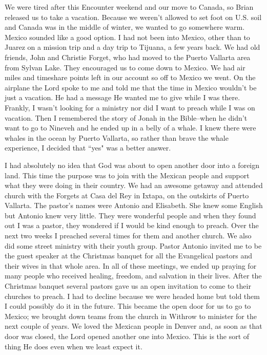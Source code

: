 \documentclass[oneside,12pt]{book}
\begin{document}
We were tired after this Encounter weekend and our move to Canada, so Brian released us to take a vacation. Because we weren't allowed to set foot on U.S. soil and Canada was in the middle of winter, we wanted to go somewhere warm.  Mexico sounded like a good option. I had not been into Mexico, other than to Juarez on a mission trip and a day trip to Tijuana, a few years back. We had old friends, John and Christie Forget, who had moved to the Puerto Vallarta area from Sylvan Lake. They encouraged us to come down to Mexico. We had air miles and timeshare points left in our account so off to Mexico we went. On the airplane the Lord spoke to me and told me that the time in Mexico wouldn't be just a vacation. He had a message He wanted me to give while I was there. Frankly, I wasn't looking for a ministry nor did I want to preach while I was on vacation. Then I remembered the story of Jonah in the Bible--when he didn't want to go to Nineveh and he ended up in a belly of a whale. I knew there were whales in the ocean by Puerto Vallarta, so rather than brave the whale experience, I decided that ``yes" was a better answer.

I had absolutely no idea that God was about to open another door into a foreign land. This time the purpose was to join with the Mexican people and support what they were doing in their country. We had an awesome getaway and attended church with the Forgets at Casa del Rey in Ixtapa, on the outskirts of Puerto Vallarta. The pastor's names were Antonio and Elisabeth. She knew some English but Antonio knew very little. They were wonderful people and when they found out I was a pastor, they wondered if I would be kind enough to preach. Over the next two weeks I preached several times for them and another church. We also did some street ministry with their youth group. Pastor Antonio invited me to be the guest speaker at the Christmas banquet for all the Evangelical pastors and their wives in that whole area. In all of these meetings, we ended up praying for many people who received healing, freedom, and salvation in their lives. After the Christmas banquet several pastors gave us an open invitation to come to their churches to preach. I had to decline because we were headed home but told them I could possibly do it in the future. This became the open door for us to go to Mexico; we brought down teams from the church in Withrow to minister for the next couple of years. We loved the Mexican people in Denver and, as soon as that door was closed, the Lord opened another one into Mexico. This is the sort of thing He does even when we least expect it. 
\end{document}
